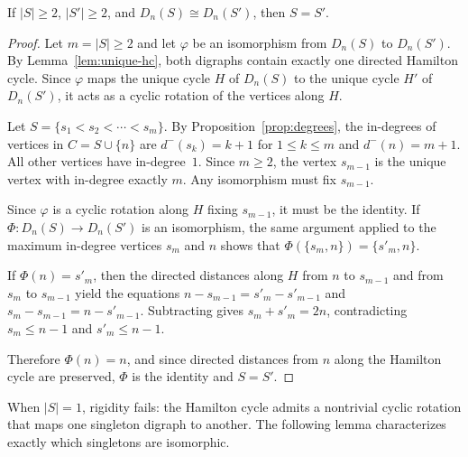 \begin{theorem}\label{thm:rigid}
If $|S| \ge 2$, $|S'| \ge 2$, and $D_n(S) \cong D_n(S')$, then $S = S'$.
\end{theorem}
\begin{proof}
Let $m = |S| \ge 2$ and let $\varphi$ be an isomorphism from $D_n(S)$ to
$D_n(S')$. By Lemma~\ref{lem:unique-hc}, both digraphs contain exactly one
directed Hamilton cycle. Since $\varphi$ maps the unique cycle $H$ of $D_n(S)$
to the unique cycle $H'$ of $D_n(S')$, it acts as a cyclic rotation of the
vertices along $H$.

Let $S = \{s_1 < s_2 < \cdots < s_m\}$. By Proposition~\ref{prop:degrees},
the in-degrees of vertices in $C = S \cup \{n\}$ are
$d^{-}(s_k) = k + 1$ for $1 \le k \le m$ and $d^{-}(n) = m + 1$. All other
vertices have in-degree~$1$. Since $m \ge 2$, the vertex $s_{m-1}$ is the
unique vertex with in-degree exactly $m$. Any isomorphism must fix $s_{m-1}$.

Since $\varphi$ is a cyclic rotation along $H$ fixing $s_{m-1}$, it must be
the identity. If $\Phi : D_n(S) \to D_n(S')$ is an isomorphism, the same
argument applied to the maximum in-degree vertices $s_m$ and $n$ shows that
$\Phi(\{s_m, n\}) = \{s'_m, n\}$.

If $\Phi(n) = s'_m$, then the directed distances along $H$ from $n$ to
$s_{m-1}$ and from $s_m$ to $s_{m-1}$ yield the equations
$n - s_{m-1} = s'_m - s'_{m-1}$ and $s_m - s_{m-1} = n - s'_{m-1}$.
Subtracting gives $s_m + s'_m = 2n$, contradicting
$s_m \le n - 1$ and $s'_m \le n - 1$.

Therefore $\Phi(n) = n$, and since directed distances from $n$ along the
Hamilton cycle are preserved, $\Phi$ is the identity and $S = S'$.
\end{proof}


When $|S| = 1$, rigidity fails: the Hamilton cycle admits a nontrivial cyclic
rotation that maps one singleton digraph to another. The following lemma
characterizes exactly which singletons are isomorphic.

